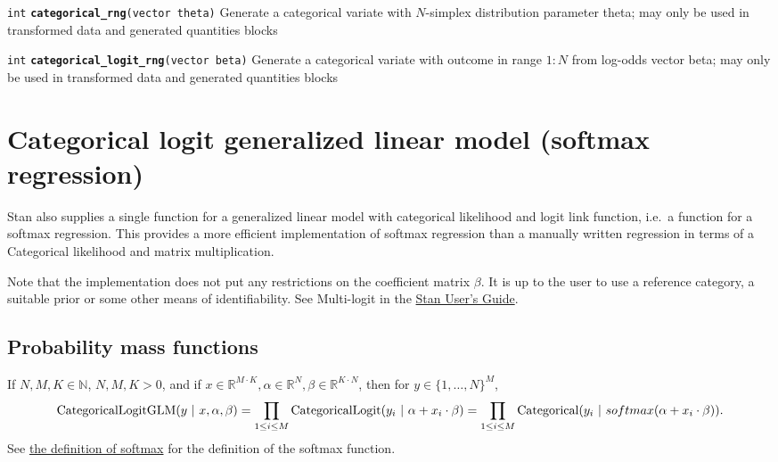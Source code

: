 \documentclass[
  10pt,
]{book}
\begin{document}

\texttt{int} \textbf{\texttt{categorical\_rng}}\texttt{(vector\ theta)}\newline
Generate a categorical variate with \(N\)-simplex distribution parameter
theta; may only be used in transformed data and generated quantities blocks


\texttt{int} \textbf{\texttt{categorical\_logit\_rng}}\texttt{(vector\ beta)}\newline
Generate a categorical variate with outcome in range \(1:N\) from
log-odds vector beta; may only be used in transformed data and generated
quantities blocks

\hypertarget{categorical-logit-glm}{%
\section{Categorical logit generalized linear model (softmax regression)}\label{categorical-logit-glm}}

Stan also supplies a single function for a generalized linear model
with categorical likelihood and logit link function, i.e.~a function
for a softmax regression. This provides a more efficient
implementation of softmax regression than a manually written
regression in terms of a Categorical likelihood and matrix
multiplication.

Note that the implementation does not put any restrictions on the coefficient
matrix \(\beta\). It is up to the user to use a reference category, a suitable
prior or some other means of identifiability. See Multi-logit in the
\href{https://mc-stan.org/users/documentation/}{Stan User's Guide}.

\hypertarget{probability-mass-functions-1}{%
\subsection{Probability mass functions}\label{probability-mass-functions-1}}

If \(N,M,K \in \mathbb{N}\), \(N,M,K > 0\), and if \(x\in \mathbb{R}^{M\cdot K}, \alpha \in \mathbb{R}^N, \beta\in \mathbb{R}^{K\cdot N}\), then for \(y \in \{1,\ldots,N\}^M\),
\[ \text{CategoricalLogitGLM}(y~|~x,\alpha,\beta) = \\[5pt]
\prod_{1\leq i \leq M}\text{CategoricalLogit}(y_i~|~\alpha+x_i\cdot\beta) = \\[15pt]
\prod_{1\leq i \leq M}\text{Categorical}(y_i~|~softmax(\alpha+x_i\cdot\beta)). \]
See \protect\hyperlink{softmax}{the definition of softmax} for the definition of the softmax function.
\end{document}
